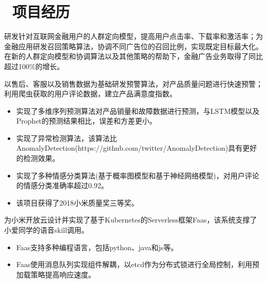 \documentclass{resume}
\begin{document}

\section{\faUsers\ 项目经历}

\begin{onehalfspacing}
研发针对互联网金融用户的人群定向模型，提高用户点击率、下载率和激活率；为金融应用研发召回策略算法，协调不同广告位的召回比例，实现既定目标最大化。在新的人群定向模型和协调算法以及其他策略的帮助下，金融广告业务取得了同比超过100\%的增长。
\end{onehalfspacing}


\begin{onehalfspacing}
以售后、客服以及销售数据为基础研发预警算法，对产品质量问题进行快速预警；利用爬虫获取的用户评论数据，建立产品满意度指数。
\begin{itemize}
  \item 实现了多维序列预测算法对产品销量和故障数据进行预测，与LSTM模型以及Prophet的预测结果相比，误差和方差更小。
  \item 实现了异常检测算法，该算法比AnomalyDetection(https://github.com/twitter/AnomalyDetection)具有更好的检测效果。
  \item 实现了多种情感分类算法(基于概率图模型和基于神经网络模型)，对用户评论的情感分类准确率超过0.92。
  \item 该项目获得了2018小米质量奖三等奖。
\end{itemize}
\end{onehalfspacing}


\begin{onehalfspacing}
为小米开放云设计并实现了基于Kubernetes的Serverless框架Faas，该系统支撑了小爱同学的语音skill调用。
\begin{itemize}
  \item Faas支持多种编程语言，包括python、java和js等。
  \item Faas使用消息队列实现组件解耦，以etcd作为分布式锁进行全局控制，利用预加载策略提高响应速度。
\end{itemize}
\end{onehalfspacing}
\end{document}

